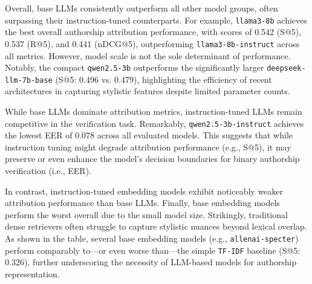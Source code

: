 \documentclass[11pt]{article}
\begin{document}
Overall, base LLMs consistently outperform all other model groups, often surpassing their instruction-tuned counterparts. For example, \texttt{llama3-8b} achieves the best overall authorship attribution performance, with scores of 0.542 (S@5), 0.537 (R@5), and 0.441 (nDCG@5), outperforming \texttt{llama3-8b-instruct} across all metrics. However, model scale is not the sole determinant of performance. Notably, the compact \texttt{qwen2.5-3b} outperforms the significantly larger \texttt{deepseek-llm-7b-base} (S@5: 0.496 vs. 0.479), highlighting the efficiency of recent architectures in capturing stylistic features despite limited parameter counts.

While base LLMs dominate attribution metrics, instruction-tuned LLMs remain competitive in the verification task. Remarkably, \texttt{qwen2.5-3b-instruct} achieves the lowest EER of 0.078 across all evaluated models. This suggests that while instruction tuning might degrade attribution performance (e.g., S@5), it may preserve or even enhance the model's decision boundaries for binary authorship verification (i.e., EER).

In contrast, instruction-tuned embedding models exhibit noticeably weaker attribution performance than base LLMs. Finally, base embedding models perform the worst overall due to the small model size. Strikingly, traditional dense retrievers often struggle to capture stylistic nuances beyond lexical overlap. As shown in the table, several base embedding models (e.g., \texttt{allenai-specter}) perform comparably to---or even worse than---the simple \texttt{TF-IDF} baseline (S@5: 0.326), further underscoring the necessity of LLM-based models for authorship representation.
\end{document}
